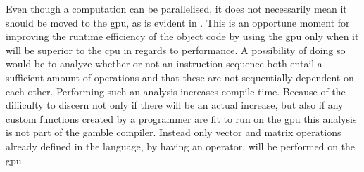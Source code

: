 Even though a computation can be parallelised, it does not necessarily mean it should be moved to the \acrshort{gpu}, as is evident in .
This is an opportune moment for improving the runtime efficiency of the object code by using the \acrshort{gpu} only when it will be superior to the \acrshort{cpu} in regards to performance.
A possibility of doing so would be to analyze whether or not an instruction sequence both entail a sufficient amount of operations and that these are not sequentially dependent on each other.
Performing such an analysis increases compile time.
Because of the difficulty to discern not only if there will be an actual increase, but also if any custom functions created by a programmer are fit to run on the \acrshort{gpu} this analysis is not part of the \gls{gamble} compiler.
Instead only vector and matrix operations already defined in the language, by having an operator, will be performed on the \acrshort{gpu}.

